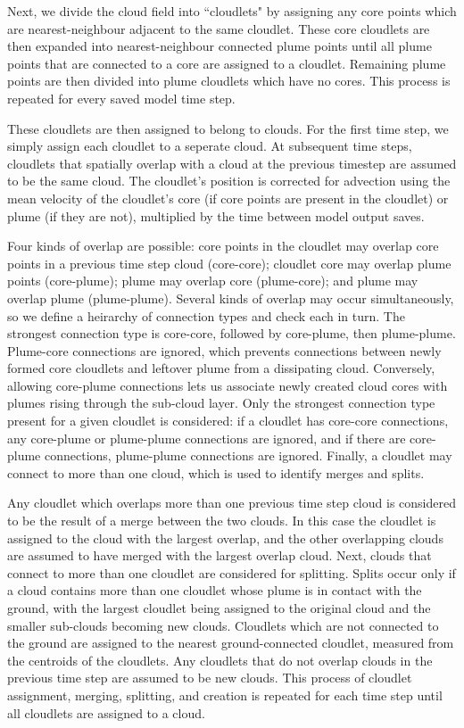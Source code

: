 \documentclass[acp]{copernicus}
\begin{document}
Next, we divide the cloud field into ``cloudlets" by assigning any core points 
which are nearest-neighbour adjacent to the same cloudlet.  These core 
cloudlets are then expanded into nearest-neighbour connected plume points 
until all plume points that are connected to a core are assigned to a 
cloudlet.  Remaining plume points are then divided into plume cloudlets which 
have no cores.  This process is repeated for every saved model time step.

These cloudlets are then assigned to belong to clouds.  For the first time step,
we simply assign each cloudlet to a seperate cloud.  At subsequent time steps,
cloudlets that spatially overlap with a cloud at the previous timestep are
assumed to be the same cloud.  The cloudlet's position is corrected for
advection using the mean velocity of the cloudlet's core (if core points are
present in the cloudlet) or plume (if they are not), multiplied by the time
between model output saves.

Four kinds of overlap are possible: core points in the cloudlet may overlap 
core points in a previous time step cloud (core-core); cloudlet core may 
overlap plume points (core-plume); plume may overlap core (plume-core); and 
plume may overlap plume (plume-plume).  Several kinds of overlap may occur 
simultaneously, so we define a heirarchy of connection types and check each 
in turn.  The strongest connection type is core-core, followed by core-plume,
then plume-plume.  Plume-core connections are ignored, which prevents 
connections between newly formed core cloudlets and leftover plume from 
a dissipating cloud.  Conversely, allowing core-plume connections lets us 
associate newly created cloud cores with plumes rising through the sub-cloud 
layer.  Only the strongest connection type present for a given cloudlet is 
considered: if a cloudlet has core-core connections, any core-plume or 
plume-plume connections are ignored, and if there are core-plume connections,
plume-plume connections are ignored.  Finally, a cloudlet may connect to more
than one cloud, which is used to identify merges and splits.

Any cloudlet which overlaps more than one previous time step cloud is 
considered to be the result of a merge between the two clouds.  In this case 
the cloudlet is assigned to the cloud with the largest overlap, and the 
other overlapping clouds are assumed to have merged with the largest overlap
cloud.  Next, clouds that connect to more than one cloudlet are considered for
splitting.  Splits occur only if a cloud contains more than one cloudlet whose
plume is in contact with the ground, with the largest cloudlet being assigned 
to the original cloud and the smaller sub-clouds becoming new clouds. 
Cloudlets which are not connected to the ground are assigned to the nearest
ground-connected cloudlet, measured from the centroids of the cloudlets.  
Any cloudlets that do not overlap clouds in the previous time step are assumed
to be new clouds.  This process of cloudlet assignment, merging, splitting, and 
creation is repeated for each time step until all cloudlets are assigned to a
cloud.
  
\end{document}
